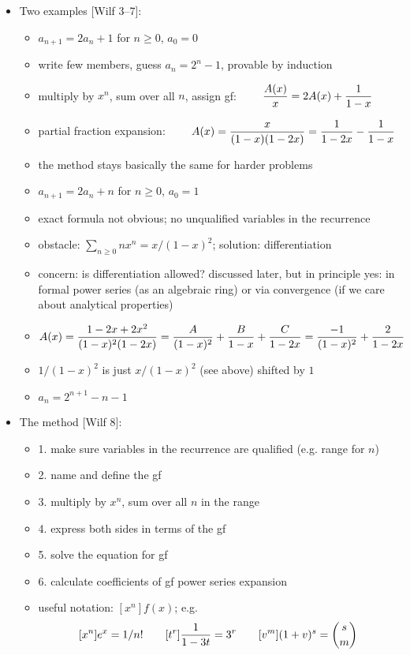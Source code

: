 \documentclass[10pt, a4paper]{article}
\begin{document}
\begin{itemize}
\item 
Two examples [Wilf 3--7]:
\begin{itemize}
    \item $a_{n+1} = 2a_n + 1$ for $n\ge 0$, $a_0 = 0$
    \item write few members, guess $a_n = 2^n-1$, provable by induction
    \item multiply by $x^n$, sum over all $n$, assign gf: $\displaystyle \qquad{A(x)\over x}=2A(x)+{1\over 1-x}$
    \item partial fraction expansion: $\displaystyle \qquad A(x)={x\over (1-x)(1-2x)}={1\over 1-2x}-{1\over 1-x}$
    \item the method stays basically the same for harder problems
    \item $a_{n+1}=2a_n+n$ for $n\ge 0$, $a_0=1$
    \item exact formula not obvious; no unqualified variables in the recurrence
    \item obstacle: $\sum_{n\ge 0} nx^n = x/(1-x)^2$; solution: differentiation
    \item concern: is differentiation allowed? discussed later, but in principle yes:
        in formal power series (as an algebraic ring) or via convergence (if we care about analytical properties)
    \item $\displaystyle A(x) = {1-2x+2x^2\over (1-x)^2(1-2x)} = {A\over (1-x)^2} + {B\over 1-x} + {C\over 1-2x} = {-1\over (1-x)^2} + {2\over 1-2x}$
    \item $1/(1-x)^2$ is just $x/(1-x)^2$ (see above) shifted by $1$
    \item $a_n=2^{n+1}-n-1$
\end{itemize}

\item 
The method [Wilf 8]:
\begin{itemize}
    \item 1. make sure variables in the recurrence are qualified (e.g. range for $n$)
    \item 2. name and define the gf
    \item 3. multiply by $x^n$, sum over all $n$ in the range
    \item 4. express both sides in terms of the gf
    \item 5. solve the equation for gf
    \item 6. calculate coefficients of gf power series expansion
    \item useful notation: $[x^n]f(x)$; e.g. $$[x^n]e^x=1/n!\qquad [t^r]{1\over 1-3t}=3^r\qquad [v^m](1+v)^s={s\choose m}$$         
\end{itemize}


\end{itemize}
\end{document}
